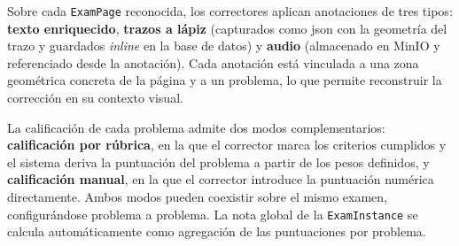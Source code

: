 Sobre cada \texttt{ExamPage} reconocida, los correctores aplican
anotaciones de tres tipos: \textbf{texto enriquecido}, \textbf{trazos a
lápiz} (capturados como \acs{json} con la geometría del trazo y
guardados \textit{inline} en la base de datos) y \textbf{audio}
(almacenado en MinIO y referenciado desde la anotación). Cada anotación
está vinculada a una zona geométrica concreta de la página y a un
problema, lo que permite reconstruir la corrección en su contexto
visual.

La calificación de cada problema admite dos modos complementarios:
\textbf{calificación por rúbrica}, en la que el corrector marca los
criterios cumplidos y el sistema deriva la puntuación del problema a
partir de los pesos definidos, y \textbf{calificación manual}, en la
que el corrector introduce la puntuación numérica directamente. Ambos
modos pueden coexistir sobre el mismo examen, configurándose problema
a problema. La nota global de la \texttt{ExamInstance} se calcula
automáticamente como agregación de las puntuaciones por problema.
